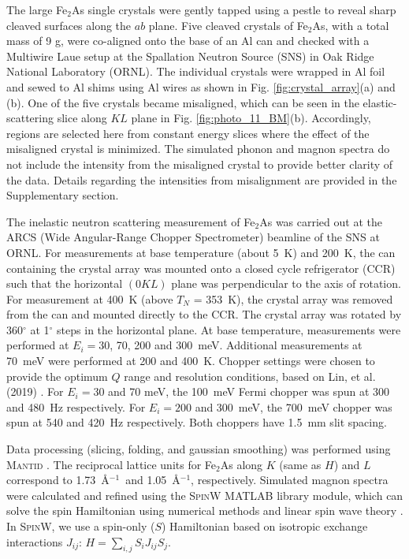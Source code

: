 \documentclass[10pt,doublespacing,edeposit]{uiucthesis2020}
\begin{document}
\begin{mainmatter}
The large Fe$_2$As single crystals were gently tapped using a pestle to reveal sharp cleaved surfaces along the $ab$ plane.
Five cleaved crystals of Fe$_2$As, with a total mass of 9 g, were co-aligned onto the base of an Al can and checked with a Multiwire Laue setup at the Spallation Neutron Source (SNS) \cite{mason2006spallation} in Oak Ridge National Laboratory (ORNL). The individual crystals were wrapped in Al foil and sewed to Al shims using Al wires as shown in Fig. \ref{fig:crystal_array}(a) and (b).
One of the five crystals became misaligned, which can be seen in the elastic-scattering slice along $KL$ plane in Fig. \ref{fig:photo_11_BM}(b).
Accordingly, regions are selected here from constant energy slices where the effect of the misaligned crystal is minimized. The simulated phonon and magnon spectra do not include the intensity from the misaligned crystal to provide better clarity of the data. Details regarding the intensities from misalignment are provided in the Supplementary section.

The inelastic neutron scattering measurement of Fe$_2$As
was carried out at the ARCS (Wide Angular-Range Chopper Spectrometer) beamline \cite{ doi:10.1063/1.3680104} of the SNS at ORNL. For measurements at  base temperature (about 5~K) and 200~K, the can containing the crystal array was mounted onto a closed cycle refrigerator (CCR) such that the horizontal $(0KL)$ plane was perpendicular to the axis of rotation. For measurement at 400~K (above $T_N$ = 353~K), the crystal array was removed from the can and mounted directly to the CCR. The crystal array was rotated by 360$^{\circ}$ at 1$^{\circ}$ steps in the horizontal plane.
At base temperature, measurements were performed at $E_i = 30$, 70, 200 and 300~meV.  Additional measurements at 70~meV were performed at 200 and 400~K.
Chopper settings were chosen to provide the optimum $Q$ range and resolution conditions, based on Lin, et al. (2019) \cite{Lin2019}. For $E_i = 30$ and  70 meV, the 100~meV Fermi chopper was spun at 300 and 480~Hz respectively.  For $E_i = 200$ and 300~meV, the 700~meV chopper was spun at 540 and 420~Hz respectively.  Both choppers have 1.5~mm slit spacing.


Data processing (slicing, folding, and gaussian smoothing) was performed using \textsc{Mantid} \cite{Arnold2014}. The reciprocal lattice units for Fe$_2$As along $K$ (same as $H$) and $L$ correspond to 1.73~\AA$^{-1}$~and 1.05~\AA$^{-1}$, respectively.
Simulated magnon spectra were calculated and refined using the \textsc{SpinW MATLAB} library module, which can solve the spin Hamiltonian using numerical methods and linear spin wave theory \cite{Toth_2015}. 
In \textsc{SpinW}, we use a spin-only ($S$)  Hamiltonian based on isotropic exchange interactions $J_{ij}$: $ H = \sum_{i,j} S_i J_{ij} S_j$.
    


\end{mainmatter}
\end{document}
